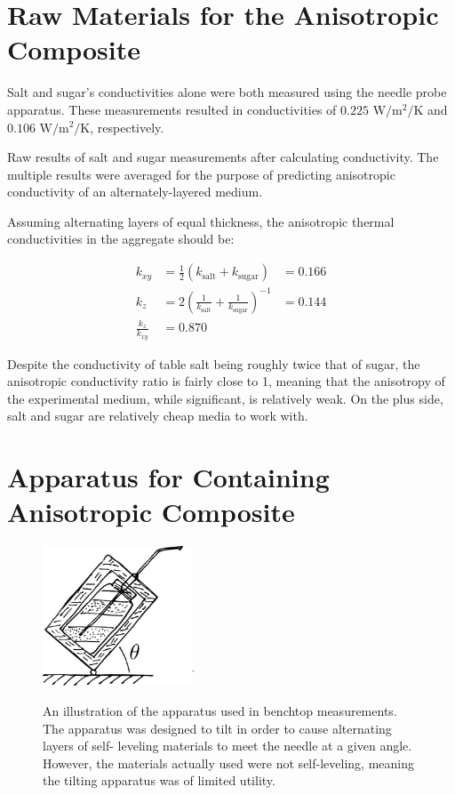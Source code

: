 \section{Raw Materials for the Anisotropic Composite}

Salt and sugar's conductivities alone were both measured using the needle probe
apparatus. These measurements resulted in conductivities of
\(0.225\) \(\textrm{W}/\textrm{m}^2/\textrm{K}\) and 
\(0.106\) \(\textrm{W}/\textrm{m}^2/\textrm{K}\), respectively.

\begin{table}[h]
\centering

\label{tab:saltnsugar}
\caption{Raw results of salt and sugar measurements after calculating conductivity. The multiple results were averaged for the purpose of predicting anisotropic conductivity of an alternately-layered medium.}
\end{table}

Assuming alternating layers of equal thickness, the anisotropic thermal
conductivities in the aggregate should be:

\begin{align}
k_{xy} &= \frac12 \left( k_{\textrm{salt}} + k_{\textrm{sugar}} \right) &= \boxed{0.166}\\
k_z &= 2 \left( \frac1{k_{\textrm{salt}}} + \frac1{k_{\textrm{sugar}}} \right)^{-1} &= \boxed{0.144}\\
\frac{k_z}{k_{xy}} &= \boxed{0.870}
\end{align}

Despite the conductivity of table salt being roughly twice that of sugar, the
anisotropic conductivity ratio is fairly close to 1, meaning that the anisotropy
of the experimental medium, while significant, is relatively weak. On the plus
side, salt and sugar are relatively cheap media to work with.

\section{Apparatus for Containing Anisotropic Composite}

\begin{figure}[h]
\centering
\includegraphics[width=0.4\textwidth]{fig/tilter_diagram.png}
\label{fig:tilter_diagram}
\caption{An illustration of the apparatus used in benchtop measurements. The
apparatus was designed to tilt in order to cause alternating layers of self-
leveling materials to meet the needle at a given angle. However, the materials
actually used were not self-leveling, meaning the tilting apparatus was of 
limited utility.}
\end{figure}

